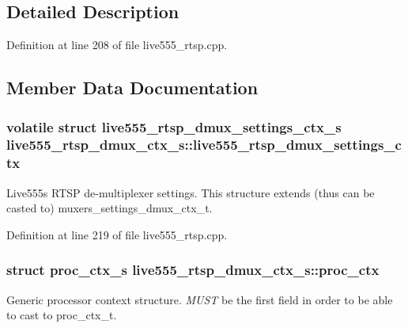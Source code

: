 \subsection{Detailed Description}


Definition at line 208 of file live555\+\_\+rtsp.\+cpp.



\subsection{Member Data Documentation}
\subsubsection[{\texorpdfstring{live555\+\_\+rtsp\+\_\+dmux\+\_\+settings\+\_\+ctx}{live555_rtsp_dmux_settings_ctx}}]{\setlength{\rightskip}{0pt plus 5cm}volatile struct {\bf live555\+\_\+rtsp\+\_\+dmux\+\_\+settings\+\_\+ctx\+\_\+s} live555\+\_\+rtsp\+\_\+dmux\+\_\+ctx\+\_\+s\+::live555\+\_\+rtsp\+\_\+dmux\+\_\+settings\+\_\+ctx}\hypertarget{structlive555__rtsp__dmux__ctx__s_a0bc32363e8188adb69ea357277bf9620}{}\label{structlive555__rtsp__dmux__ctx__s_a0bc32363e8188adb69ea357277bf9620}
Live555\textquotesingle{}s R\+T\+SP de-\/multiplexer settings. This structure extends (thus can be casted to) muxers\+\_\+settings\+\_\+dmux\+\_\+ctx\+\_\+t. 

Definition at line 219 of file live555\+\_\+rtsp.\+cpp.

\subsubsection[{\texorpdfstring{proc\+\_\+ctx}{proc_ctx}}]{\setlength{\rightskip}{0pt plus 5cm}struct {\bf proc\+\_\+ctx\+\_\+s} live555\+\_\+rtsp\+\_\+dmux\+\_\+ctx\+\_\+s\+::proc\+\_\+ctx}\hypertarget{structlive555__rtsp__dmux__ctx__s_aa791deca78228791b72b86da1b74bd20}{}\label{structlive555__rtsp__dmux__ctx__s_aa791deca78228791b72b86da1b74bd20}
Generic processor context structure. {\itshape M\+U\+ST} be the first field in order to be able to cast to proc\+\_\+ctx\+\_\+t. 

